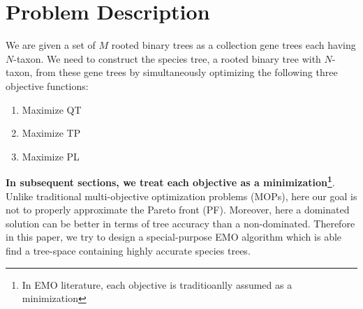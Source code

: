 \section{Problem Description}
\label{sec:problem}
We are given a set of $M$ rooted binary trees as a collection gene trees each having $N$-taxon. We need to construct the species tree, a rooted binary tree with $N$-taxon, from these gene trees by simultaneously optimizing the following three objective functions:  
\begin{enumerate}[label=$F\arabic*$.]
		
	\item Maximize QT 
	\item Maximize TP
	\item Maximize PL 
\end{enumerate}
\textbf{In subsequent sections, we treat each objective as a minimization\footnote{In EMO literature, each objective is traditioanlly assumed as a minimization }}. Unlike traditional multi-objective optimization
problems (MOPs), here our goal is not to properly approximate the Pareto front (PF). 
Moreover, here a dominated solution can be better in terms of tree accuracy than a non-dominated. Therefore in this paper, we try to design a special-purpose EMO algorithm which is able find a tree-space containing highly accurate species trees. 
